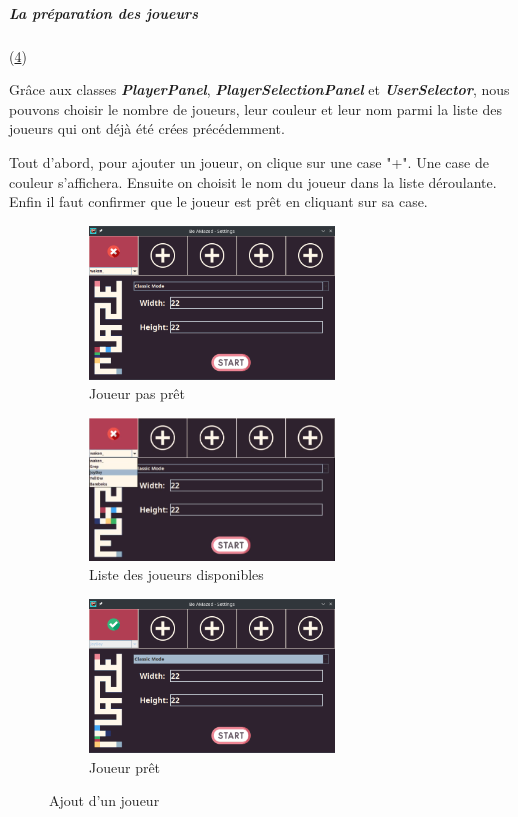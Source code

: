 \newpage

\subparagraph*{La préparation des joueurs} (\ref{fig:PlayerSelection})

Grâce aux classes \textbf{\textit{PlayerPanel}}, \textbf{\textit{PlayerSelectionPanel}} et \textbf{\textit{UserSelector}}, nous pouvons choisir le nombre de joueurs, leur couleur et leur nom parmi la liste des joueurs qui ont déjà été crées précédemment.

Tout d'abord, pour ajouter un joueur, on clique sur une case "+". Une case de couleur s'affichera. Ensuite on choisit le nom du joueur dans la liste déroulante. Enfin il faut confirmer que le joueur est prêt en cliquant sur sa case.

\begin{figure}[h!]
    \centering
    \begin{subfigure}{6.5cm}
        \includegraphics[width=6.5cm]{ressources/Implementation/Labyrinthe/Controleur/SettingsMenu_NotReady.png}%
        \caption{Joueur pas prêt}
        \label{fig:PlayerNotReady}
    \end{subfigure}
    \qquad
    \begin{subfigure}{6.5cm}
        \includegraphics[width=6.5cm]{ressources/Implementation/Labyrinthe/Controleur/SettingsMenu_PlayerList.png}%
        \caption{Liste des joueurs disponibles}
        \label{fig:PlayersAvailable}
    \end{subfigure}
    \qquad
    \begin{subfigure}{6.5cm}
        \includegraphics[width=6.5cm]{ressources/Implementation/Labyrinthe/Controleur/SettingsMenu_Ready.png}%
        \caption{Joueur prêt}
        \label{fig:PlayerReady}
    \end{subfigure}
    \caption{Ajout d'un joueur}
    \label{fig:PlayerSelection}
\end{figure}
\FloatBarrier
